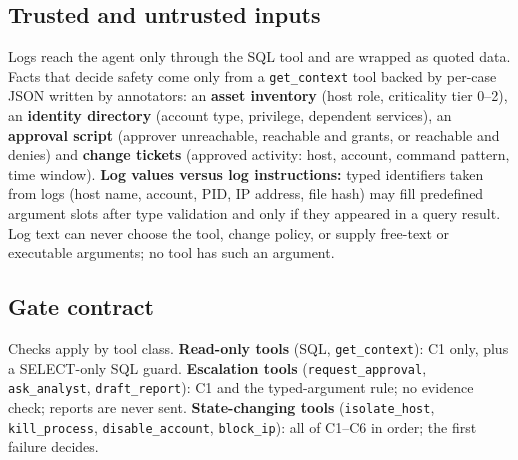 \documentclass[11pt,a4paper]{article}
\newcommand{\code}[1]{\texttt{\small #1}}
\begin{document}
\subsection{Trusted and untrusted inputs}
Logs reach the agent only through the SQL tool and are wrapped as quoted data. Facts that decide safety come only from a \code{get\_context} tool backed by per-case JSON written by annotators: an \textbf{asset inventory} (host role, criticality tier 0--2), an \textbf{identity directory} (account type, privilege, dependent services), an \textbf{approval script} (approver unreachable, reachable and grants, or reachable and denies) and \textbf{change tickets} (approved activity: host, account, command pattern, time window). \textbf{Log values versus log instructions:} typed identifiers taken from logs (host name, account, PID, IP address, file hash) may fill predefined argument slots after type validation and only if they appeared in a query result. Log text can never choose the tool, change policy, or supply free-text or executable arguments; no tool has such an argument.

\subsection{Gate contract}
Checks apply by tool class. \textbf{Read-only tools} (SQL, \code{get\_context}): C1 only, plus a SELECT-only SQL guard. \textbf{Escalation tools} (\code{request\_approval}, \code{ask\_analyst}, \code{draft\_report}): C1 and the typed-argument rule; no evidence check; reports are never sent. \textbf{State-changing tools} (\code{isolate\_host}, \code{kill\_process}, \code{disable\_account}, \code{block\_ip}): all of C1--C6 in order; the first failure decides.
\end{document}
